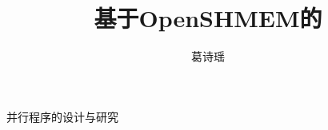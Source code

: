 \documentclass[xetex,adobefonts,a4paper]{XDBAthesis}
\begin{document}
    \title{基于OpenSHMEM的}{并行程序的设计与研究}   %
    \author{葛诗瑶}
    \maketitle

    \frontmatter
%    
    \tableofcontents

    \mainmatter
    \pagestyle{content}
    
    
    
    
    
    \appendix


    \backmatter
%    
	
\end{document}
